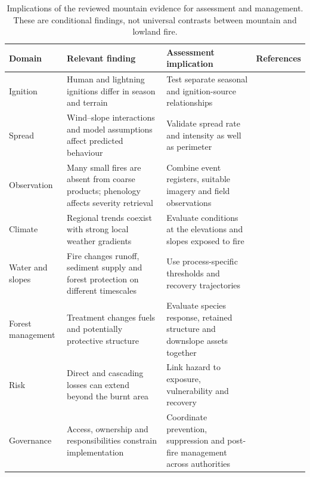 \documentclass[11pt,a4paper]{article}
\begin{document}
\begin{table}[H]
\centering
\footnotesize
\setlength{\tabcolsep}{4pt}
\renewcommand{\arraystretch}{1.1}
\caption{Implications of the reviewed mountain evidence for assessment and management. These are conditional findings, not universal contrasts between mountain and lowland fire.}
\label{tab:contrast}
\begin{tabularx}{\textwidth}{@{}>{\raggedright\arraybackslash}p{2.1cm} >{\raggedright\arraybackslash}X >{\raggedright\arraybackslash}X >{\raggedright\arraybackslash}p{3.0cm}@{}}
\toprule
\textbf{Domain} & \textbf{Relevant finding} & \textbf{Assessment implication} & \textbf{References} \\
\midrule
Ignition & Human and lightning ignitions differ in season and terrain & Test separate seasonal and ignition-source relationships & \citep{vacchiano_modeling_2018, conedera_lightninginduced_2006} \\
Spread & Wind--slope interactions and model assumptions affect predicted behaviour & Validate spread rate and intensity as well as perimeter & \citep{malanchini_modeling_2025, hayajneh_wind_2026} \\
Observation & Many small fires are absent from coarse products; phenology affects severity retrieval & Combine event registers, suitable imagery and field observations & \citep{bakke_datadriven_2023, morresi_mapping_2022} \\
Climate & Regional trends coexist with strong local weather gradients & Evaluate conditions at the elevations and slopes exposed to fire & \citep{wastl_recent_2012, schunk_forest_2013} \\
Water and slopes & Fire changes runoff, sediment supply and forest protection on different timescales & Use process-specific thresholds and recovery trajectories & \citep{rengers_evaluating_2024, gehring_shallow_2019} \\
Forest management & Treatment changes fuels and potentially protective structure & Evaluate species response, retained structure and downslope assets together & \citep{maringer_temporal_2016, gamba_prescribed_2025} \\
Risk & Direct and cascading losses can extend beyond the burnt area & Link hazard to exposure, vulnerability and recovery & \citep{laporta_postwildfire_2025, papathomakohle_towards_2025} \\
Governance & Access, ownership and responsibilities constrain implementation & Coordinate prevention, suppression and post-fire management across authorities & \citep{kirschner_governance_2024, gorrizmifsud_current_2026} \\
\bottomrule
\end{tabularx}
\end{table}
\end{document}
